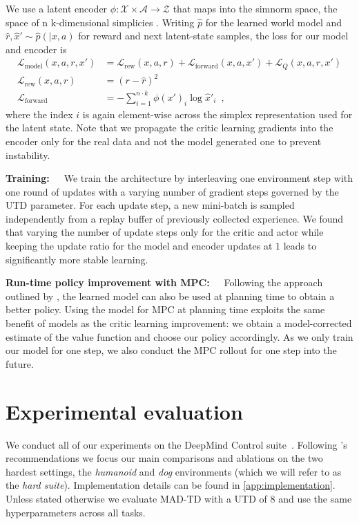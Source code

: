 We use a latent encoder $\phi: \mathcal{X} \times \mathcal{A} \rightarrow \mathcal{Z}$ that maps into the simnorm space, the space of n k-dimensional simplicies \parencite{lavoie2023simplicial}.
Writing $\hat{p}$ for the learned world model and \mbox{$\hat{r}, \hat{x}' \sim \hat{p}(|x,a)$} for reward and next latent-state samples, the loss for our model and encoder is
\begin{align}
    \mathcal{L}_\mathrm{model}(x,a,r,x') &= \mathcal{L}_\mathrm{rew}(x,a,r) + \mathcal{L}_\mathrm{forward}(x,a,x') + \mathcal{L}_Q(x,a,r,x')\\
    \mathcal{L}_\mathrm{rew}(x,a,r) &= \left( r - \hat{r} \right)^2 \\
    \mathcal{L}_\mathrm{forward} &= - \sum_{i=1}^{n \cdot k} \phi(x')_i \log \hat{x}'_i\enspace,
\end{align}
where the index $i$ is again element-wise across the simplex representation used for the latent state.
Note that we propagate the critic learning gradients into the encoder only for the real data and not the model generated one to prevent instability.

\textbf{Training:}~~~We train the architecture by interleaving one environment step with one round of updates with a varying number of gradient steps governed by the UTD parameter.
For each update step, a new mini-batch is sampled independently from a replay buffer of previously collected experience.
We found that varying the number of update steps only for the critic and actor while keeping the update ratio for the model and encoder updates at $1$ leads to significantly more stable learning.

\textbf{Run-time policy improvement with MPC:}~~~Following the approach outlined by  \textcite{hansen2022temporal}, the learned model can also be used at planning time to obtain a better policy.
Using the model for MPC at planning time exploits the same benefit of models as the critic learning improvement: we obtain a model-corrected estimate of the value function and choose our policy accordingly.
As we only train our model for one step, we also conduct the MPC rollout for one step into the future.


\section{Experimental evaluation}


We conduct all of our experiments on the DeepMind Control suite~\parencite{tunyasuvunakool2020dmcontrol}. Following \textcite{nauman2024bigger}'s recommendations we focus our main comparisons and ablations on the two hardest settings, the \emph{humanoid} and \emph{dog} environments (which we will refer to as the \emph{hard suite}).
Implementation details can be found in \autoref{app:implementation}.
Unless stated otherwise we evaluate MAD-TD with a UTD of 8 and use the same hyperparameters across all tasks.


